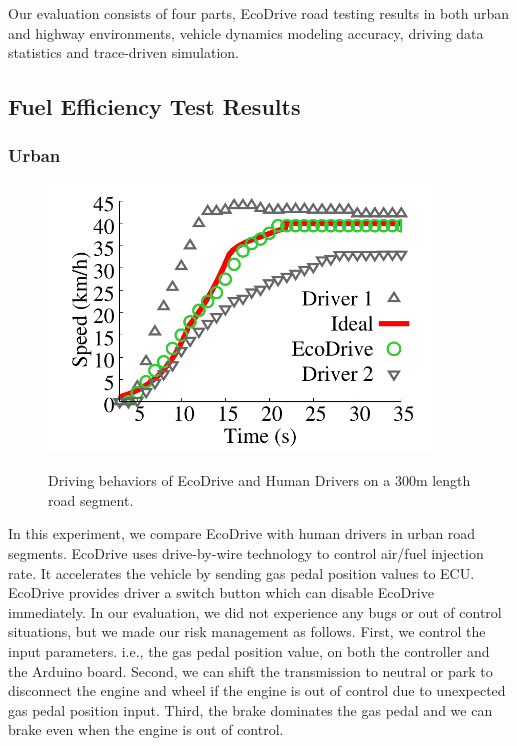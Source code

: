 
Our evaluation consists of four parts, 
EcoDrive road testing results in both urban and highway environments, 
vehicle dynamics modeling accuracy, 
driving data statistics and trace-driven simulation. 


\subsection{Fuel Efficiency Test Results}



\subsubsection{Urban}

\begin{figure}[ht]
\begin{center}
\includegraphics[width=4.0in,angle=0]{Figs/EcoDrive/evaluation/sampledrive240.pdf}
\vspace{-0.0cm}
\caption{Driving behaviors of EcoDrive and Human Drivers on a 300m length road segment.}
\vspace{-0.6cm}
\label{sampledrive}
\end{center}
\end{figure}


In this experiment, we compare EcoDrive with human drivers in urban
road segments.  
EcoDrive uses drive-by-wire technology to control air/fuel injection rate. 
It accelerates the vehicle by sending gas pedal position values to ECU. 
EcoDrive provides driver a switch button which can disable EcoDrive immediately. 
In our evaluation, we did not experience any bugs or out of control situations, 
but we made our risk management as follows. 
First, we control the input parameters. i.e., the gas pedal position value, 
on both the controller and the Arduino board. 
Second, we can shift the transmission to neutral or park to disconnect the engine and wheel
if the engine is out of control due to unexpected gas pedal position input. 
Third, the brake dominates the gas pedal and we can brake
even when the engine is out of control. 



